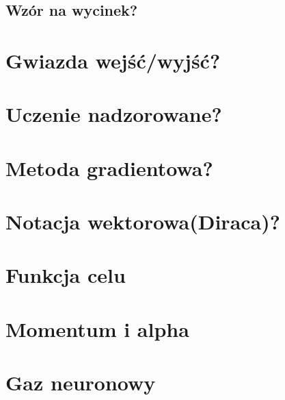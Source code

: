 \documentclass[a4paper,12pt]{article}
\begin{document}
\subsection{Wzór na wycinek?}

\section{Gwiazda wejść/wyjść?}

\section{Uczenie nadzorowane?}

\section{Metoda gradientowa?}

\section{Notacja wektorowa(Diraca)?}

\section{Funkcja celu}

\section{Momentum i alpha}

\section{Gaz neuronowy}
\end{document}
